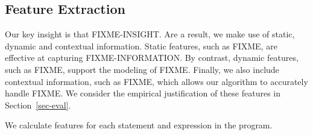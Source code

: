 \documentclass[conference]{IEEEtran}
\begin{document}
\subsection{Feature Extraction}
\label{sec-features}

Our key insight is that FIXME-INSIGHT. Are a result, we make use of
static, dynamic and contextual information. Static features, such as FIXME,
are effective at capturing FIXME-INFORMATION. By contrast, dynamic
features, such as FIXME, support the modeling of FIXME. Finally, we also
include contextual information, such as FIXME, which allows our algorithm
to accurately handle FIXME. We consider the empirical justification of
these features in Section~\ref{sec-eval}.

We calculate features for each statement and expression in the program.
\end{document}
